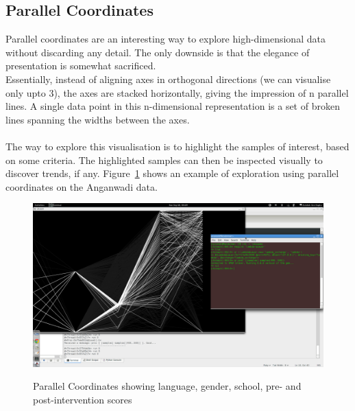 \documentclass[10pt]{article}
\begin{document}
\subsection{Parallel Coordinates}
Parallel coordinates are an interesting way to explore high-dimensional data without discarding any detail. The only downside is that the elegance of presentation is somewhat sacrificed.\\
Essentially, instead of aligning axes in orthogonal directions (we can visualise only upto 3), the axes are stacked horizontally, giving the impression of n parallel lines. A single data point in this n-dimensional representation is a set of broken lines spanning the widths between the axes.\\\\
The way to explore this visualisation is to highlight the samples of interest, based on some criteria. The highlighted samples can then be inspected visually to discover trends, if any. Figure~\ref{ParallelCoordinates} shows an example of exploration using parallel coordinates on the Anganwadi data.
\begin{figure}
\caption{Parallel Coordinates showing language, gender, school, pre- and post-intervention scores}
\label{ParallelCoordinates}
\begin{center}
\includegraphics[width=150mm]{ReportMedia/ParallelCoordinates.jpg}\\
\end{center}
\end{figure}
\newpage
\end{document}
